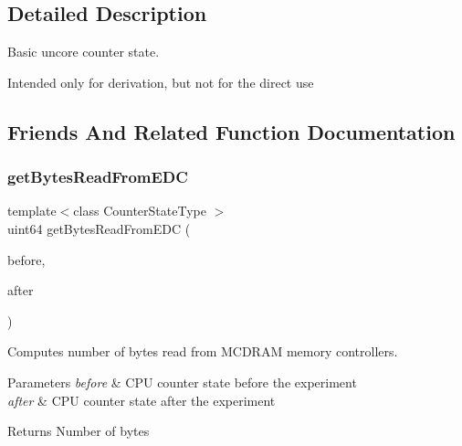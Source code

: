 \subsection{Detailed Description}
Basic uncore counter state. 

Intended only for derivation, but not for the direct use 

\subsection{Friends And Related Function Documentation}
\mbox{\label{class_uncore_counter_state_a8a7e839f24a02691d4b3509fc2adee51}} 
\subsubsection{\texorpdfstring{get\+Bytes\+Read\+From\+E\+DC}{getBytesReadFromEDC}}
{\footnotesize\ttfamily template$<$class Counter\+State\+Type $>$ \\
uint64 get\+Bytes\+Read\+From\+E\+DC (\begin{DoxyParamCaption}\item[{const Counter\+State\+Type \&}]{before,  }\item[{const Counter\+State\+Type \&}]{after }\end{DoxyParamCaption})\hspace{0.3cm}{\ttfamily [friend]}}



Computes number of bytes read from M\+C\+D\+R\+AM memory controllers. 


\begin{DoxyParams}{Parameters}
{\em before} & C\+PU counter state before the experiment \\
\hline
{\em after} & C\+PU counter state after the experiment \\
\hline
\end{DoxyParams}
\begin{DoxyReturn}{Returns}
Number of bytes 
\end{DoxyReturn}
\mbox{\label{class_uncore_counter_state_a0f28a32a3edeaecd916ba097aee99d7f}} 
